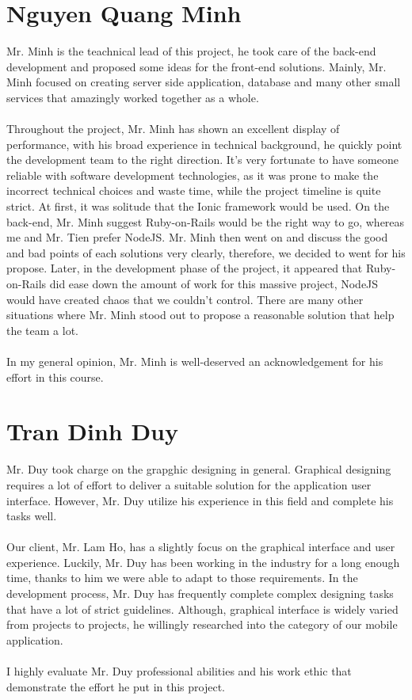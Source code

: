 \section{Nguyen Quang Minh}
Mr. Minh is the teachnical lead of this project, he took care of the back-end development and proposed some ideas for the front-end solutions. Mainly, Mr. Minh focused on creating server side application, database and many other small services that amazingly worked together as a whole.
\\
\\
Throughout the project, Mr. Minh has shown an excellent display of performance, with his broad experience in technical background, he quickly point the development team to the right direction. It's very fortunate to have someone reliable with software development technologies, as it was prone to make the incorrect technical choices and waste time, while the project timeline is quite strict. At first, it was solitude that the Ionic framework would be used. On the back-end, Mr. Minh suggest Ruby-on-Rails would be the right way to go, whereas me and Mr. Tien prefer NodeJS. Mr. Minh then went on and discuss the good and bad points of each solutions very clearly, therefore, we decided to went for his propose. Later, in the development phase of the project, it appeared that Ruby-on-Rails did ease down the amount of work for this massive project, NodeJS would have created chaos that we couldn't control. There are many other situations where Mr. Minh stood out to propose a reasonable solution that help the team a lot.
\\
\\
In my general opinion, Mr. Minh is well-deserved an acknowledgement for his effort in this course.
\section{Tran Dinh Duy}
Mr. Duy took charge on the grapghic designing in general. Graphical designing requires a lot of effort to deliver a suitable solution for the application user interface. However, Mr. Duy utilize his experience in this field and complete his tasks well.
\\
\\
Our client, Mr. Lam Ho, has a slightly focus on the graphical interface and user experience. Luckily, Mr. Duy has been working in the industry for a long enough time, thanks to him we were able to adapt to those requirements. In the development process, Mr. Duy has frequently complete complex designing tasks that have a lot of strict guidelines. Although, graphical interface is widely varied from projects to projects, he willingly researched into the category of our mobile application.
\\
\\
I highly evaluate Mr. Duy professional abilities and his work ethic that demonstrate the effort he put in this project.
